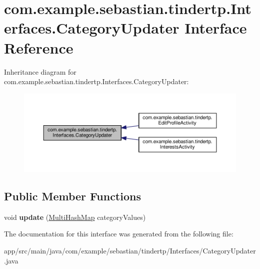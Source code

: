 \hypertarget{interfacecom_1_1example_1_1sebastian_1_1tindertp_1_1Interfaces_1_1CategoryUpdater}{}\section{com.\+example.\+sebastian.\+tindertp.\+Interfaces.\+Category\+Updater Interface Reference}
\label{interfacecom_1_1example_1_1sebastian_1_1tindertp_1_1Interfaces_1_1CategoryUpdater}


Inheritance diagram for com.\+example.\+sebastian.\+tindertp.\+Interfaces.\+Category\+Updater\+:
\nopagebreak
\begin{figure}[H]
\begin{center}
\leavevmode
\includegraphics[width=350pt]{interfacecom_1_1example_1_1sebastian_1_1tindertp_1_1Interfaces_1_1CategoryUpdater__inherit__graph}
\end{center}
\end{figure}
\subsection*{Public Member Functions}
\begin{DoxyCompactItemize}
\item 
void {\bfseries update} (\hyperlink{classcom_1_1example_1_1sebastian_1_1tindertp_1_1commonTools_1_1MultiHashMap}{Multi\+Hash\+Map} category\+Values)\hypertarget{interfacecom_1_1example_1_1sebastian_1_1tindertp_1_1Interfaces_1_1CategoryUpdater_ac32f4c1e7b6cb5486895de558efa5570}{}\label{interfacecom_1_1example_1_1sebastian_1_1tindertp_1_1Interfaces_1_1CategoryUpdater_ac32f4c1e7b6cb5486895de558efa5570}

\end{DoxyCompactItemize}


The documentation for this interface was generated from the following file\+:\begin{DoxyCompactItemize}
\item 
app/src/main/java/com/example/sebastian/tindertp/\+Interfaces/Category\+Updater.\+java\end{DoxyCompactItemize}
